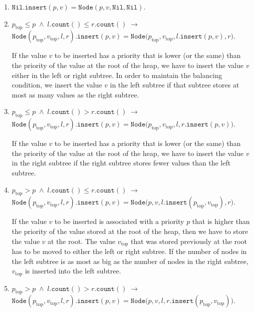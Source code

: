 \begin{enumerate}
\item $\texttt{Nil}.\texttt{insert}(p,v) = \texttt{Node}(p,v,\texttt{Nil}, \texttt{Nil})$.
\item $p_{\mathrm{top}} \leq p \;\wedge\; l.\texttt{count}() \leq r.\texttt{count}() \;\rightarrow $   \\[0.1cm]
      \hspace*{1.3cm} 
      $\texttt{Node}(p_{\mathrm{top}},v_\mathrm{top},l,r).\texttt{insert}(p,v) =
                 \texttt{Node}\bigl(p_\mathrm{top},v_\mathrm{top},l.\texttt{insert}(p,v), r\bigr)$.
                 
      If the value $v$ to be inserted has a priority that is lower (or the same) than the priority of
      the value at the root of the heap, we have to insert the value $v$ either in the left or right
      subtree.  In order to maintain the balancing condition, we insert the value $v$ in the left
      subtree if that subtree stores at most as many values as the right subtree.
\item $p_{\mathrm{top}} \leq p \;\wedge\; l.\texttt{count}() > r.\texttt{count}() \;\rightarrow $   \\[0.1cm]
      \hspace*{1.3cm} 
      $\texttt{Node}(p_{\mathrm{top}},v_\mathrm{top},l,r).\texttt{insert}(p,v) =
                 \texttt{Node}\bigl(p_\mathrm{top},v_\mathrm{top},l,r.\texttt{insert}(p,v)\bigr)$.

      If the value $v$ to be inserted has a priority that is lower (or the same) than the priority of
      the value at the root of the heap, we have to insert the value $v$ in the right
      subtree if the right subtree  stores fewer values than the left subtree.
\item $p_{\mathrm{top}} > p \;\wedge\; l.\texttt{count}() \leq r.\texttt{count}() \;\rightarrow $ \\[0.1cm]
      \hspace*{1.3cm} 
      $\texttt{Node}(p_{\mathrm{top}},v_\mathrm{top},l,r).\texttt{insert}(p,v) =
                 \texttt{Node}\bigl(p,v,l.\texttt{insert}(p_\mathrm{top},v_\mathrm{top}), r\bigr)$.

      If the value $v$ to be inserted is associated with a priority $p$ that is higher than the priority of
      the value stored at the root of the heap, then we have to store the value $v$ at the root.
      The value $v_\mathrm{top}$ that was stored previously at the root has to be moved to either
      the left or right subtree.  If the number of nodes in the left subtree is as most as big as
      the number of nodes in the right subtree, $v_\mathrm{top}$ is inserted into the left subtree.
\item $p_{\mathrm{top}} > p \;\wedge\; l.\texttt{count}() > r.\texttt{count}() \;\rightarrow $ \\[0.1cm] 
      \hspace*{1.3cm} 
      $\texttt{Node}(p_{\mathrm{top}},v_\mathrm{top},l,r).\texttt{insert}(p,v) =
                 \texttt{Node}\bigl(p,v,l,r.\texttt{insert}(p_\mathrm{top},v_\mathrm{top})\bigr)$.


\end{enumerate}

